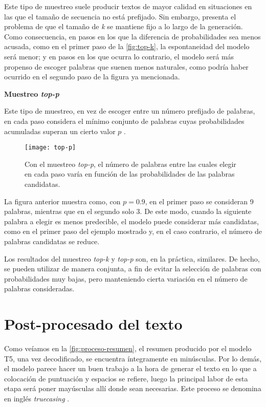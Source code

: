 Este tipo de muestreo suele producir textos de mayor calidad en situaciones en las que el tamaño de secuencia no está prefijado. Sin embargo, presenta el problema de que el tamaño de \emph{k} se mantiene fijo a lo largo de la generación. Como consecuencia, en pasos en los que la diferencia de probabilidades sea menos acusada, como en el primer paso de la \autoref{fig:top-k}, la espontaneidad del modelo será menor; y en pasos en los que ocurra lo contrario, el modelo será más propenso de escoger palabras que suenen menos naturales, como podría haber ocurrido en el segundo paso de la figura ya mencionada.


\bigskip
\noindent
\textbf{Muestreo \emph{top-p}}

Este tipo de muestreo, en vez de escoger entre un número prefijado de palabras, en cada paso considera el mínimo conjunto de palabras cuyas probabilidades acumuladas superan un cierto valor $p$ \cite{holtzman20}.

\begin{figure}[!h]
	\centering
	\texttt{[image: top-p]}
	\caption[Ejemplo de muestreo \emph{top-p}.]{Con el muestreo \emph{top-p}, el número de palabras entre las cuales elegir en cada paso varía en función de las probabilidades de las palabras candidatas.}
	\label{fig:top-p}
\end{figure}

La figura anterior muestra como, con $p=0.9$, en el primer paso se consideran 9 palabras, mientras que en el segundo solo 3. De este modo, cuando la siguiente palabra a elegir es menos predecible, el modelo puede considerar más candidatas, como en el primer paso del ejemplo mostrado y, en el caso contrario, el número de palabras candidatas se reduce.

Los resultados del muestreo \emph{top-k} y \emph{top-p} son, en la práctica, similares. De hecho, se pueden utilizar de manera conjunta, a fin de evitar la selección de palabras con probabilidades muy bajas, pero manteniendo cierta variación en el número de palabras consideradas.



\section{Post-procesado del texto} \label{sec:postprocesado}

Como veíamos en la \autoref{fig:proceso-resumen}, el resumen producido por el modelo T5, una vez decodificado, se encuentra íntegramente en minúsculas. Por lo demás, el modelo parece hacer un buen trabajo a la hora de generar el texto en lo que a colocación de puntuación y espacios se refiere, luego la principal labor de esta etapa será poner mayúsculas allí donde sean necesarias. Este proceso se denomina en inglés \emph{truecasing} \cite{lita03}.

